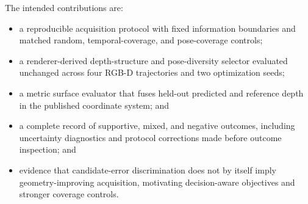 The intended contributions are:
\begin{itemize}
  \item a reproducible acquisition protocol with fixed information boundaries
        and matched random, temporal-coverage, and pose-coverage controls;
  \item a renderer-derived depth-structure and pose-diversity selector evaluated
        unchanged across four RGB-D trajectories and two optimization seeds;
  \item a metric surface evaluator that fuses held-out predicted and reference
        depth in the published coordinate system; and
  \item a complete record of supportive, mixed, and negative outcomes, including
        uncertainty diagnostics and protocol corrections made before outcome
        inspection; and
  \item evidence that candidate-error discrimination does not by itself imply
        geometry-improving acquisition, motivating decision-aware objectives
        and stronger coverage controls.
\end{itemize}
